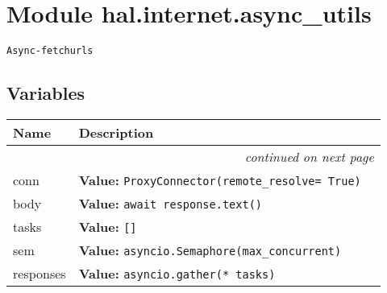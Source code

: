 %
%
%


\section{Module hal.internet.async\_utils}

    \label{hal:internet:async_utils}
\begin{alltt}
Async-fetch urls 
\end{alltt}



  \subsection{Variables}

    \vspace{-1cm}
\hspace{\varindent}\begin{longtable}{|p{\varnamewidth}|p{\vardescrwidth}|l}
\cline{1-2}
\cline{1-2} \centering \textbf{Name} & \centering \textbf{Description}& \\
\cline{1-2}
\endhead\cline{1-2}\multicolumn{3}{r}{\small\textit{continued on next page}}\\\endfoot\cline{1-2}
\endlastfoot\raggedright c\-o\-n\-n\- & \raggedright \textbf{Value:} 
{\tt ProxyConnector(remote\_resolve= True)}&\\
\cline{1-2}
\raggedright b\-o\-d\-y\- & \raggedright \textbf{Value:} 
{\tt await response.text()}&\\
\cline{1-2}
\raggedright t\-a\-s\-k\-s\- & \raggedright \textbf{Value:} 
{\tt []}&\\
\cline{1-2}
\raggedright s\-e\-m\- & \raggedright \textbf{Value:} 
{\tt asyncio.Semaphore(max\_concurrent)}&\\
\cline{1-2}
\raggedright r\-e\-s\-p\-o\-n\-s\-e\-s\- & \raggedright \textbf{Value:} 
{\tt asyncio.gather(* tasks)}&\\
\cline{1-2}
\end{longtable}

